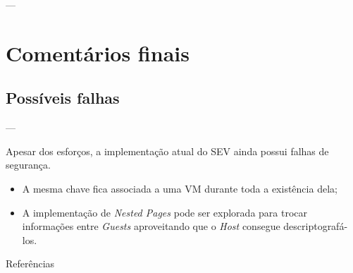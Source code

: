 \documentclass{beamer}
\newcommand{\innertitle}[1]{\textbf{\large {#1}}}
\newcommand{\autotitle}[1]{\secname{} --- \subsecname}
\begin{document}
\begin{frame}{\autotitle{}}
    \tiny{}
\end{frame}

\section{Comentários finais}

\subsection{Possíveis falhas}

\begin{frame}{\autotitle{}}
    \innertitle{\subsecname}

    Apesar dos esforços, a implementação atual do SEV ainda possui falhas de
    segurança.

    \begin{itemize}
        \item A mesma chave fica associada a uma VM durante toda a existência
            dela;
        \item A implementação de \textit{Nested Pages} pode ser explorada para
            trocar informações entre \textit{Guests} aproveitando que o
            \textit{Host} consegue descriptografá-los.
    \end{itemize}
\end{frame}



\begin{frame}{Referências}
    \nocite{*}
    
\end{frame}
\end{document}
